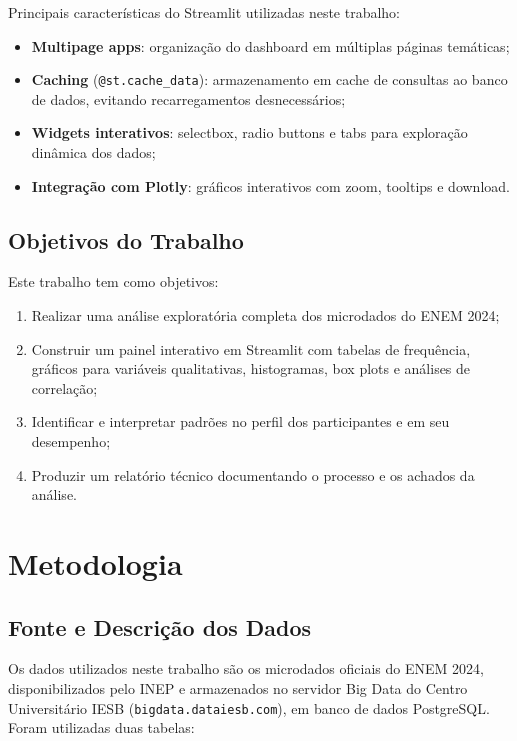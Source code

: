 \documentclass[
    12pt,
    oneside,
    a4paper,
    chapter=TITLE,
    section=TITLE
]{abntex2}
\begin{document}
Principais características do Streamlit utilizadas neste trabalho:

\begin{itemize}
    \item \textbf{Multipage apps}: organização do dashboard em múltiplas páginas temáticas;
    \item \textbf{Caching} (\texttt{@st.cache\_data}): armazenamento em cache de consultas
    ao banco de dados, evitando recarregamentos desnecessários;
    \item \textbf{Widgets interativos}: selectbox, radio buttons e tabs para exploração
    dinâmica dos dados;
    \item \textbf{Integração com Plotly}: gráficos interativos com zoom, tooltips e download.
\end{itemize}

\section{Objetivos do Trabalho}

Este trabalho tem como objetivos:

\begin{enumerate}
    \item Realizar uma análise exploratória completa dos microdados do ENEM 2024;
    \item Construir um painel interativo em Streamlit com tabelas de frequência, gráficos
    para variáveis qualitativas, histogramas, box plots e análises de correlação;
    \item Identificar e interpretar padrões no perfil dos participantes e em seu desempenho;
    \item Produzir um relatório técnico documentando o processo e os achados da análise.
\end{enumerate}

\chapter{Metodologia}

\section{Fonte e Descrição dos Dados}

Os dados utilizados neste trabalho são os microdados oficiais do ENEM 2024, disponibilizados
pelo INEP e armazenados no servidor Big Data do Centro Universitário IESB
(\texttt{bigdata.dataiesb.com}), em banco de dados PostgreSQL. Foram utilizadas duas tabelas:
\end{document}
